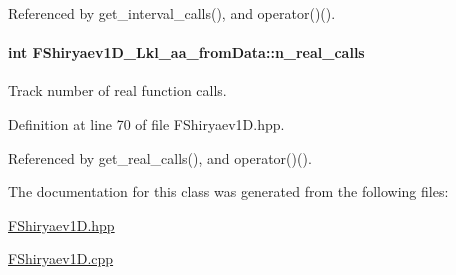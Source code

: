\-Referenced by get\-\_\-interval\-\_\-calls(), and operator()().

\hypertarget{classFShiryaev1D__Lkl__aa__fromData_a1a371cc6b90e1b0a1975d1ddbcdac4eb}{
\paragraph[{n\-\_\-real\-\_\-calls}]{\setlength{\rightskip}{0pt plus 5cm}int {\bf \-F\-Shiryaev1\-D\-\_\-\-Lkl\-\_\-aa\-\_\-from\-Data\-::n\-\_\-real\-\_\-calls}}}\label{classFShiryaev1D__Lkl__aa__fromData_a1a371cc6b90e1b0a1975d1ddbcdac4eb}


\-Track number of real function calls. 



\-Definition at line 70 of file \-F\-Shiryaev1\-D.\-hpp.



\-Referenced by get\-\_\-real\-\_\-calls(), and operator()().



\-The documentation for this class was generated from the following files\-:\begin{DoxyCompactItemize}
\item 
\hyperlink{FShiryaev1D_8hpp}{\-F\-Shiryaev1\-D.\-hpp}\item 
\hyperlink{FShiryaev1D_8cpp}{\-F\-Shiryaev1\-D.\-cpp}\end{DoxyCompactItemize}
